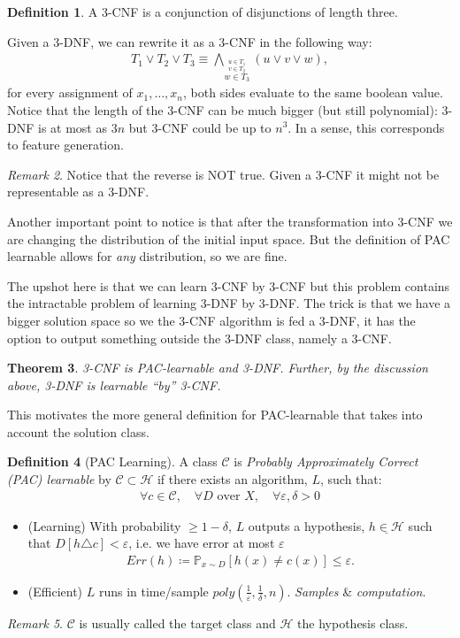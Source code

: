 \documentclass[12pt, letterpaper]{article}
\numberwithin{equation}{section} %
\newcommand{\ul}{\underline}
\newcommand{\mb}{\mathbb}
\newcommand{\mc}{\mathcal}
\newcommand{\ve}{\varepsilon}
\newtheorem{theorem}{Theorem}[section]
\theoremstyle{definition}
\newtheorem{definition}[theorem]{Definition}
\theoremstyle{remark}
\newtheorem{remark}[theorem]{Remark}
\begin{document}
\begin{definition}
    A 3-CNF is a conjunction of disjunctions of length three.
\end{definition}

Given a 3-DNF, we can rewrite it as a 3-CNF in the following way:
\begin{align}
    T_1 \lor T_2 \lor T_3 \equiv \bigwedge\limits_{\stackrel{u\in T_1}{\stackrel{v\in T_2}{w\in T_3}}} \left(u \lor v \lor w\right),
\end{align}
for every assignment of $x_1,\ldots,x_n$, both sides evaluate to the same boolean value. Notice that the length of the 3-CNF can be much bigger (but still polynomial): 3-DNF is at most as $3n$ but 3-CNF could be up to $n^3$. In a sense, this corresponds to feature generation.
\begin{remark}
    Notice that the reverse is NOT true. Given a 3-CNF it might not be representable as a 3-DNF. 
    
    Another important point to notice is that after the transformation into 3-CNF we are changing the distribution of the initial input space. But the definition of PAC learnable allows for \emph{any} distribution, so we are fine.
\end{remark}

The upshot here is that we can learn 3-CNF by 3-CNF but this problem contains the intractable problem of learning 3-DNF by 3-DNF. The trick is that we have a bigger solution space so we the 3-CNF algorithm is fed a 3-DNF, it has the option to output something outside the 3-DNF class, namely a 3-CNF.

\begin{theorem}
    3-CNF is PAC-learnable and 3-DNF. Further, by the discussion above, 3-DNF is learnable ``by'' 3-CNF.
\end{theorem}

This motivates the more general definition for PAC-learnable that takes into account the solution class.
\begin{definition}[PAC Learning]
	A class $\mc C$ is \emph{Probably Approximately Correct (PAC) learnable} by $\mc C \subset \mc H$ if there exists an algorithm, $L$, such that:
	\begin{align}
    	\forall c \in \mc C,\quad \forall D \textrm{ over }X,\quad \forall \ve,\delta > 0
	\end{align} 
	\begin{itemize}
		\item (Learning) With probability $\geq 1 -\delta$, $L$ outputs a hypothesis, $\ul{h\in\mc H}$ 
		 such that $D[h\triangle c]<\ve$, i.e. we have error at most $\ve$
		\begin{align}
    		Err(h) \coloneqq \mb P_{x\sim D}[h(x) \ne c(x)] \leq \ve.
		\end{align}
		\item (Efficient) $L$ runs in time/sample $poly\left(\frac1\ve, \frac1\delta, n\right)$. \emph{Samples} \& \emph{computation}.
	\end{itemize}
\end{definition}
\begin{remark}
     $\mc C$ is usually called the target class and $\mc H$ the hypothesis class.
\end{remark}
\end{document}
